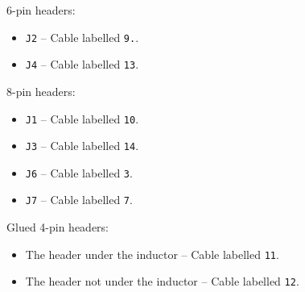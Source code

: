 6-pin headers:
\begin{itemize}[noitemsep]
  \item \verb|J2| -- Cable labelled \verb|9.|.
  \item \verb|J4| -- Cable labelled \verb|13|.
\end{itemize}

8-pin headers:
\begin{itemize}[noitemsep]
  \item \verb|J1| -- Cable labelled \verb|10|.
  \item \verb|J3| -- Cable labelled \verb|14|.
  \item \verb|J6| -- Cable labelled \verb|3|.
  \item \verb|J7| -- Cable labelled \verb|7|.
\end{itemize}

Glued 4-pin headers:
\begin{itemize}[noitemsep]
  \item The header under the inductor -- Cable labelled \verb|11|.
  \item The header not under the inductor -- Cable labelled \verb|12|.
\end{itemize}
